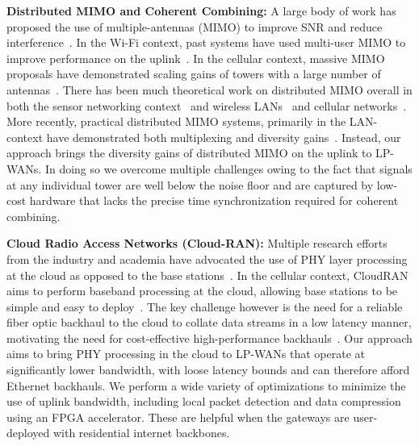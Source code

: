\noindent \textbf{Distributed MIMO and Coherent Combining: } A large body of
work has proposed the use of multiple-antennas (MIMO) to improve SNR and
reduce interference~\cite{xie2014scalable, lin2011random, kumar2013bringing}.
In the Wi-Fi context, past systems have used multi-user MIMO to improve
performance on the uplink~\cite{shen2014rate, tan2009sam, xie2014scalable}. In
the cellular context, massive MIMO proposals have demonstrated scaling gains
of towers with a large number of antennas~\cite{shepard2012argos,
larsson2014massive}. There has been much theoretical work on distributed MIMO
overall in both the sensor networking context~\cite{del2007cooperative} and
wireless LANs~\cite{dohler2004resource} and cellular
networks~\cite{sawahashi2010coordinated}.  More recently, practical
distributed MIMO systems, primarily in the LAN-context have demonstrated both
multiplexing and diversity gains~\cite{hamed2016real, yenamandra2014vidyut,
rahul2012jmb}. Instead, our approach brings the diversity gains of distributed
MIMO on the uplink to LP-WANs. In doing so we overcome multiple challenges
owing to the fact that signals at any individual tower are well below the
noise floor and are captured by low-cost hardware that lacks the precise time
synchronization required for coherent combining.

\noindent \textbf{Cloud Radio Access Networks (Cloud-RAN): } Multiple research
efforts from the industry and academia have advocated the use of PHY layer
processing at the cloud as opposed to the base stations~\cite{sabella2013ran,
hadzialic2013cloud}. In the cellular context, CloudRAN aims to perform
baseband processing at the cloud, allowing base stations to be simple and easy
to deploy~\cite{checko2015cloud, wubben2014benefits}. The key challenge
however is the need for a reliable fiber optic backhaul to the cloud to
collate data streams in a low latency manner, motivating the need for
cost-effective high-performance backhauls~\cite{liu2013case, chih2014recent}.
Our approach aims to bring PHY processing in the cloud to LP-WANs that operate
at significantly lower bandwidth, with loose latency bounds and can therefore
afford Ethernet backhauls. We perform a wide variety of optimizations to
minimize the use of uplink bandwidth, including local packet detection and
data compression using an FPGA accelerator. These are helpful when the
gateways are user-deployed with residential internet backbones.